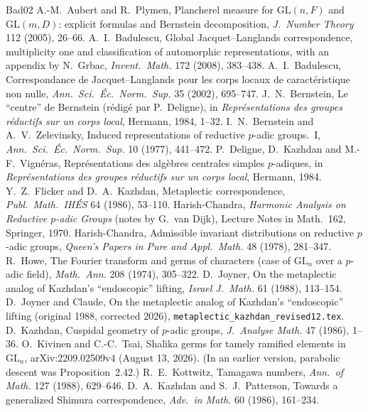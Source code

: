 \documentclass[12pt]{article}
\newcommand{\GL}{\mathrm{GL}}
\theoremstyle{plain}
\theoremstyle{definition}
\begin{document}
\begin{thebibliography}{Bad02}\small
{} A.-M.~Aubert and R.~Plymen, Plancherel measure for $\GL(n,F)$ and $\GL(m,D)$: explicit formulas and Bernstein decomposition, \emph{J.\ Number Theory} 112 (2005), 26--66.
 A.~I.~Badulescu, Global Jacquet--Langlands correspondence, multiplicity one and classification of automorphic representations, with an appendix by N.~Grbac, \emph{Invent.\ Math.} 172 (2008), 383--438.
 A.~I.~Badulescu, Correspondance de Jacquet--Langlands pour les corps locaux de caract\'eristique non nulle, \emph{Ann.\ Sci.\ \'Ec.\ Norm.\ Sup.} 35 (2002), 695--747.
 J.~N.~Bernstein, Le ``centre'' de Bernstein (r\'edig\'e par P.~Deligne), in \emph{Repr\'esentations des groupes r\'eductifs sur un corps local}, Hermann, 1984, 1--32.
 I.~N.~Bernstein and A.~V.~Zelevinsky, Induced representations of reductive $p$-adic groups.\ I, \emph{Ann.\ Sci.\ \'Ec.\ Norm.\ Sup.} 10 (1977), 441--472.
 P.~Deligne, D.~Kazhdan and M.-F.~Vign\'eras, Repr\'esentations des alg\`ebres centrales simples $p$-adiques, in \emph{Repr\'esentations des groupes r\'eductifs sur un corps local}, Hermann, 1984.
 Y.~Z.~Flicker and D.~A.~Kazhdan, Metaplectic correspondence, \emph{Publ.\ Math.\ IH\'ES} 64 (1986), 53--110.
 Harish-Chandra, \emph{Harmonic Analysis on Reductive $p$-adic Groups} (notes by G.~van Dijk), Lecture Notes in Math.\ 162, Springer, 1970.
 Harish-Chandra, Admissible invariant distributions on reductive $p$-adic groups, \emph{Queen's Papers in Pure and Appl.\ Math.} 48 (1978), 281--347.
 R.~Howe, The Fourier transform and germs of characters (case of $\GL_n$ over a $p$-adic field), \emph{Math.\ Ann.} 208 (1974), 305--322.
 D.~Joyner, On the metaplectic analog of Kazhdan's ``endoscopic'' lifting, \emph{Israel J.\ Math.} 61 (1988), 113--154.
 D.~Joyner and Claude, On the metaplectic analog of Kazhdan's ``endoscopic'' lifting (original 1988, corrected 2026), \texttt{metaplectic\_kazhdan\_revised12.tex}.
 D.~Kazhdan, Cuspidal geometry of $p$-adic groups, \emph{J.\ Analyse Math.} 47 (1986), 1--36.
 O.~Kivinen and C.-C.~Tsai, Shalika germs for tamely ramified elements in $\GL_n$, arXiv:2209.02509v4 (August 13, 2026). (In an earlier version, parabolic descent was Proposition~2.42.)
 R.~E.~Kottwitz, Tamagawa numbers, \emph{Ann.\ of Math.} 127 (1988), 629--646.
 D.~A.~Kazhdan and S.~J.~Patterson, Towards a generalized Shimura correspondence, \emph{Adv.\ in Math.} 60 (1986), 161--234.

\end{thebibliography}
\end{document}
